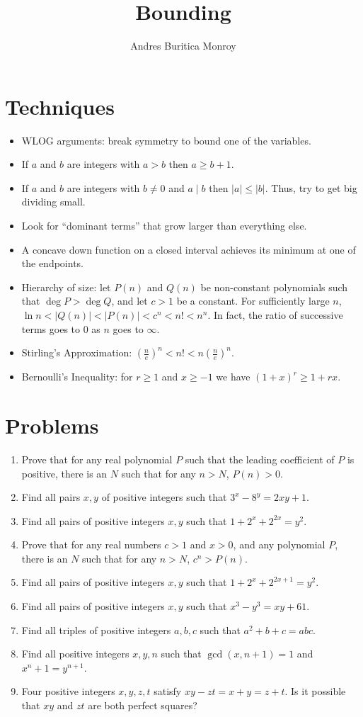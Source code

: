 \documentclass{article}
\title{Bounding}
\author{Andres Buritica Monroy}
\date{}
\begin{document}
\maketitle
\section{Techniques}
\begin{itemize}
	\item WLOG arguments: break symmetry to bound one of the variables.
	\item If $a$ and $b$ are integers with $a>b$ then $a\ge b+1$.
	\item If $a$ and $b$ are integers with $b\ne 0$ and $a\mid b$ then
	      $|a|\le|b|$. Thus, try to get big dividing small.
	\item Look for ``dominant terms'' that grow larger than everything else.
	\item A concave down function on a closed interval
	      achieves its minimum at one of the endpoints.
	\item Hierarchy of size: let $P(n)$ and $Q(n)$ be non-constant polynomials such that $\deg
		      P>\deg Q$, and let $c>1$ be a constant. For sufficiently large $n$,
	      $\ln n<|Q(n)|<|P(n)|< c^n< n!< n^n$. In fact, the ratio of successive
	      terms goes to $0$ as $n$ goes to $\infty$.
	\item Stirling's Approximation: $\left(\frac ne\right)^n<n!<n\left(\frac
		      ne\right)^n$.
	\item Bernoulli's Inequality: for $r\ge 1$ and $x\ge -1$ we have $(1+x)^r\ge
		      1+rx$.
\end{itemize}
\section{Problems}
\begin{enumerate}
	\item Prove that for any real polynomial $P$ such that the leading coefficient
	      of $P$ is positive, there is an $N$ such that for any $n>N$, $P(n)>0$.
	\item Find all pairs $x,y$ of positive integers such that $3^x-8^y=2xy+1$.
	\item Find all pairs of positive integers $x,y$ such that
	      $1+2^x+2^{2x}=y^2$.
	\item Prove that for any real numbers $c>1$ and $x>0$, and any polynomial $P$,
	      there is an $N$ such that for any $n>N$, $c^n>P(n)$.
	\item Find all pairs of positive integers $x,y$ such that
	      $1+2^x+2^{2x+1}=y^2$.
	\item Find all pairs of positive integers $x,y$ such that $x^3-y^3=xy+61$.
	\item Find all triples of positive integers $a,b,c$ such that $a^2+b+c=abc$.
	\item Find all positive integers $x,y,n$ such that $\gcd(x,n+1)=1$ and
	      $x^n+1=y^{n+1}$.
	\item Four positive integers $x,y,z,t$ satisfy $xy-zt=x+y=z+t$. Is it possible
	      that $xy$ and $zt$ are both perfect squares?
\end{enumerate}
\newpage
\end{document}
